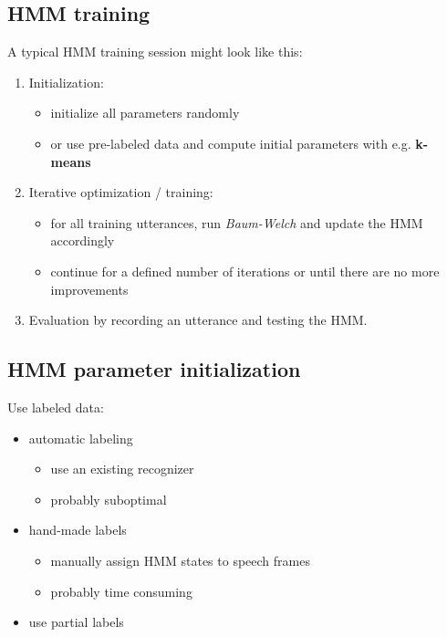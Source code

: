 \documentclass[11pt]{article}
\begin{document}
\subsection{HMM training}

A typical HMM training session might look like this:
\begin{enumerate}
    \item Initialization:
        \begin{itemize}
            \item initialize all parameters randomly
            \item or use pre-labeled data and compute initial parameters with e.g. \textbf{k-means}
        \end{itemize}
    \item Iterative optimization / training:
        \begin{itemize}
            \item for all training utterances, run \textit{Baum-Welch} and update the HMM accordingly
            \item continue for a defined number of iterations or until there are no more improvements
        \end{itemize}
    \item Evaluation by recording an utterance and testing the HMM.
\end{enumerate}

\subsection{HMM parameter initialization}

Use labeled data:
\begin{itemize}
    \item automatic labeling
        \begin{itemize}
            \item use an existing recognizer
            \item probably suboptimal
        \end{itemize}
    \item hand-made labels
        \begin{itemize}
            \item manually assign HMM states to speech frames
            \item probably time consuming
        \end{itemize}
    \item use partial labels
\end{itemize}
\end{document}
